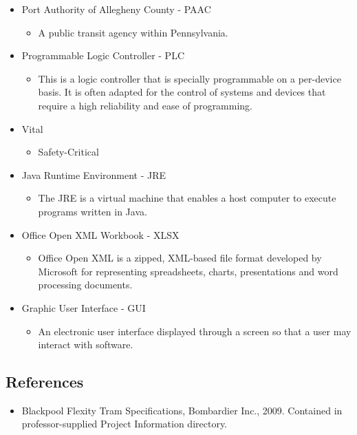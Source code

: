 \documentclass{article}
\begin{document}
\begin{itemize}
        \item Port Authority of Allegheny County - PAAC
            \begin{itemize}
            \item A public transit agency within Pennsylvania.
            \end{itemize}    
        \item Programmable Logic Controller - PLC 
            \begin{itemize}
            \item This is a logic controller that is specially programmable on a per-device basis. It is often adapted for the control of systems and devices that require a high reliability and ease of programming.
            \end{itemize}
        \item Vital
            \begin{itemize}
            \item Safety-Critical
            \end{itemize}
        \item Java Runtime Environment - JRE
            \begin{itemize}
            \item  The JRE is a virtual machine that enables a host computer to execute programs written in Java.
            \end{itemize}
        \item Office Open XML Workbook - XLSX
            \begin{itemize}
            \item  Office Open XML is a zipped, XML-based file format developed by Microsoft for representing spreadsheets, charts, presentations and word processing documents.
            \end{itemize}
        \item Graphic User Interface - GUI
            \begin{itemize}
                \item An electronic user interface  displayed through a screen so that a user may interact with software.
            \end{itemize}
    \end{itemize}
    
    \subsection{References}
    \begin{itemize}
        \item Blackpool Flexity Tram Specifications, Bombardier Inc., 2009. Contained in professor-supplied Project Information directory.
    \end{itemize}
\end{document}
